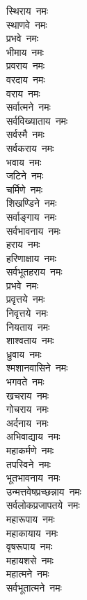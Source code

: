 \begin{multicols}{2}
\begin{flushleft}
स्थिराय~नमः\\
स्थाणवे~नमः\\
प्रभवे~नमः\\
भीमाय~नमः\\
प्रवराय~नमः\\
वरदाय~नमः\\
वराय~नमः\\
सर्वात्मने~नमः\\
सर्वविख्याताय~नमः\\
सर्वस्मै~नमः\hfill{}\\
सर्वकराय~नमः\\
भवाय~नमः\\
जटिने~नमः\\
चर्मिणे~नमः\\
शिखण्डिने~नमः\\
सर्वाङ्गाय~नमः\\
सर्वभावनाय~नमः\\
हराय~नमः\\
हरिणाक्षाय~नमः\\
सर्वभूतहराय~नमः\hfill{}\\
प्रभवे~नमः\\
प्रवृत्तये~नमः\\
निवृत्तये~नमः\\
नियताय~नमः\\
शाश्वताय~नमः\\
ध्रुवाय~नमः\\
श्मशानवासिने~नमः\\
भगवते~नमः\\
खचराय~नमः\\
गोचराय~नमः\hfill{}\\
अर्दनाय~नमः\\
अभिवाद्याय~नमः\\
महाकर्मणे~नमः\\
तपस्विने~नमः\\
भूतभावनाय~नमः\\
उन्मत्तवेषप्रच्छन्नाय~नमः\\
सर्वलोकप्रजापतये~नमः\\
महारूपाय~नमः\\
महाकायाय~नमः\\
वृषरूपाय~नमः\hfill{}\\
महायशसे~नमः\\
महात्मने~नमः\\
सर्वभूतात्मने~नमः\\

\end{flushleft}
\end{multicols}
